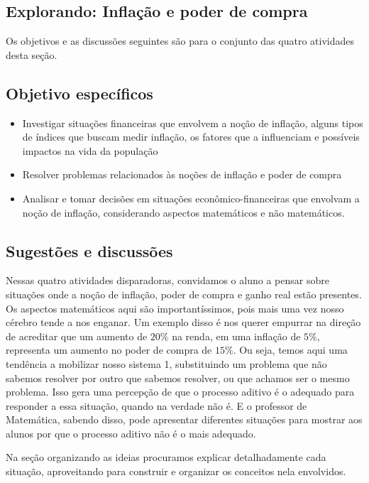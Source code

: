 \def\currentcolor{session1}
\begin{texto}
{
  \section{Explorando: Inflação e poder de compra}

  Os objetivos e as discussões seguintes são para o conjunto das quatro atividades desta seção.

  \subsection{Objetivo específicos}
  \begin{itemize}
  \item Investigar situações financeiras que envolvem a noção de inflação, alguns tipos de índices que buscam medir inflação, os fatores que a influenciam e possíveis impactos na vida da população
  \item Resolver problemas relacionados às noções de inflação e poder de compra
  \item Analisar e tomar decisões em situações econômico-financeiras que envolvam a noção de inflação, considerando aspectos matemáticos e não matemáticos.
  \end{itemize}

  \subsection{Sugestões e discussões}

  Nessas quatro atividades disparadoras, convidamos o aluno a pensar sobre situações onde a noção de inflação, poder de compra e ganho real estão presentes. Os aspectos matemáticos aqui são importantíssimos, pois mais uma vez nosso cérebro tende a nos enganar. Um exemplo disso é nos querer empurrar na direção de acreditar que um aumento de $20\%$ na renda, em uma inflação de $5\%$, representa um aumento no poder de compra de $15\%$. Ou seja, temos aqui uma tendência a mobilizar nosso sistema 1, substituindo um problema que não sabemos resolver por outro que sabemos resolver, ou que achamos ser o mesmo problema. Isso gera uma percepção de que o processo aditivo é o adequado para responder a essa situação, quando na verdade não é. E o professor de Matemática, sabendo disso, pode apresentar diferentes situações para mostrar aos alunos por que o processo aditivo não é o mais adequado.

  Na seção organizando as ideias procuramos explicar detalhadamente cada situação, aproveitando para construir e organizar os conceitos nela envolvidos.

}
\end{texto}
